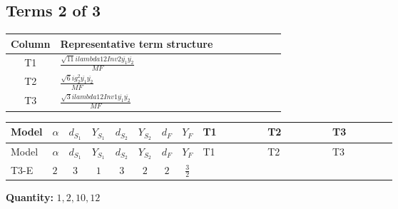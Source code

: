 \documentclass[8pt]{article}
\begin{document}
\begin{landscape}
\subsection*{Terms 2 of 3}
\begin{center}
\begin{tabular}{@{}c >{\raggedright\arraybackslash}p{0.82\linewidth}@{}}
\toprule
Column & Representative term structure \\
\midrule
T1 & \(\displaystyle \frac{\sqrt{11} i lambda12Inv2 \overline{y_{1}} \overline{y_{2}}}{MF}\) \\
\midrule
T2 & \(\displaystyle \frac{\sqrt{6} i g_{2}^{2} \overline{y_{1}} \overline{y_{2}}}{MF}\) \\
\midrule
T3 & \(\displaystyle \frac{\sqrt{3} i lambda12Inv1 \overline{y_{1}} \overline{y_{2}}}{MF}\) \\
\midrule
\bottomrule
\end{tabular}
\end{center}
\smallskip
\tiny
\begin{longtable}{@{}llcccccc >{\raggedright\arraybackslash}p{0.21\linewidth} >{\raggedright\arraybackslash}p{0.21\linewidth} >{\raggedright\arraybackslash}p{0.21\linewidth}@{}}
\toprule
Model & $\alpha$ & $d_{S_1}$ & $Y_{S_1}$ & $d_{S_2}$ & $Y_{S_2}$ & $d_F$ & $Y_F$ & T1 & T2 & T3 \\
\midrule
\endfirsthead
\toprule
Model & $\alpha$ & $d_{S_1}$ & $Y_{S_1}$ & $d_{S_2}$ & $Y_{S_2}$ & $d_F$ & $Y_F$ & T1 & T2 & T3 \\
\midrule
\endhead
T3-E & $2$ & $3$ & $1$ & $3$ & $2$ & $2$ & $\frac{3}{2}$ & \scriptsize\adjustbox{max width=\linewidth}{$\begin{gathered} - \frac{3 \sqrt{11} i lambda12Inv2 \overline{y_{1}} \overline{y_{2}}}{22 MF}\end{gathered}$} & \scriptsize\adjustbox{max width=\linewidth}{$\begin{gathered} - \frac{\sqrt{6} i g_{2}^{2} \overline{y_{1}} \overline{y_{2}}}{6 MF}\end{gathered}$} & \scriptsize\adjustbox{max width=\linewidth}{$\begin{gathered} \frac{\sqrt{3} i lambda12Inv1 \overline{y_{1}} \overline{y_{2}}}{6 MF}\end{gathered}$} \\
\midrule
\bottomrule
\end{longtable}
\clearpage
\noindent\textbf{Quantity: }$\mathrm{1,2,10,12}$\par\smallskip

\end{landscape}
\end{document}
